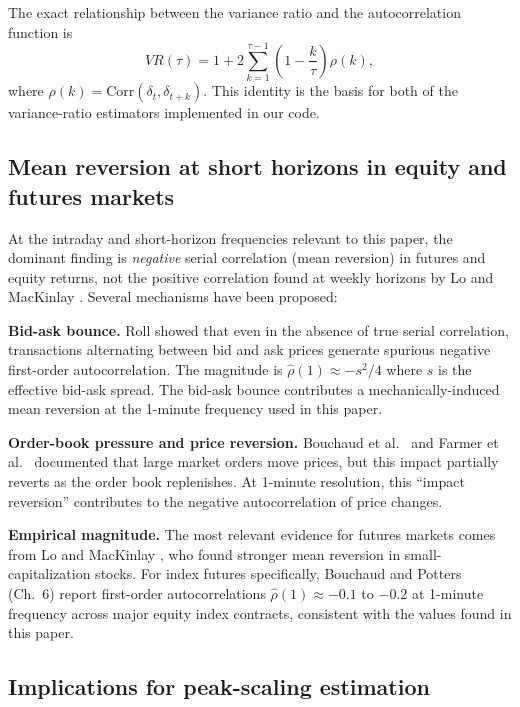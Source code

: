 \documentclass[12pt,a4paper]{article}
\begin{document}
The exact relationship between the variance ratio and the autocorrelation
function is
\begin{equation}
  VR(\tau)
  = 1 + 2\sum_{k=1}^{\tau-1}\!\left(1 - \frac{k}{\tau}\right)\rho(k),
  \label{eq:vr_rho}
\end{equation}
where $\rho(k) = \mathrm{Corr}(\delta_t, \delta_{t+k})$. This identity is the
basis for both of the variance-ratio estimators implemented in our code.

\subsection{Mean reversion at short horizons in equity and futures markets}

At the intraday and short-horizon frequencies relevant to this paper,
the dominant finding is \textit{negative} serial correlation (mean reversion)
in futures and equity returns, not the positive correlation found at weekly
horizons by Lo and MacKinlay \cite{LoMacKinlay1988}. Several mechanisms have been proposed:

\textbf{Bid-ask bounce.} Roll \cite{Roll1984} showed that even in the absence
of true serial correlation, transactions alternating between bid and ask prices
generate spurious negative first-order autocorrelation. The magnitude is
$\hat\rho(1) \approx -s^2/4$ where $s$ is the effective bid-ask spread. The
bid-ask bounce contributes a mechanically-induced mean reversion at the 1-minute
frequency used in this paper.

\textbf{Order-book pressure and price reversion.} Bouchaud et al.\ \cite{Bouchaud2004}
and Farmer et al.\ \cite{Farmer2006} documented that large market orders move prices, but
this impact partially reverts as the order book replenishes. At 1-minute
resolution, this ``impact reversion'' contributes to the negative
autocorrelation of price changes.

\textbf{Empirical magnitude.} The most relevant evidence for futures markets
comes from Lo and MacKinlay \cite{LoMacKinlay1990}, who found stronger mean reversion in
small-capitalization stocks. For index futures specifically,
Bouchaud and Potters \cite{BouchaudPotters2003} (Ch.~6) report first-order autocorrelations
$\hat\rho(1) \approx -0.1$ to $-0.2$ at 1-minute frequency across major equity
index contracts, consistent with the values found in this paper.

\subsection{Implications for peak-scaling estimation}
\end{document}
